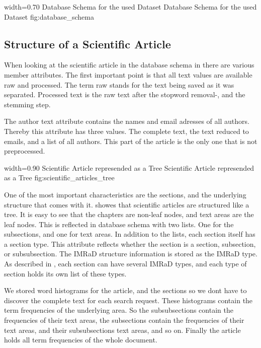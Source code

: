       {width=0.70\textwidth}
      {Database Schema for the used Dataset}
      {Database Schema for the used Dataset}
      {fig:database_schema}

\subsection{Structure of a Scientific Article}
\label{sec:structure_scientific_article}

When looking at the scientific article in the database schema in  there are various member attributes. The first important point is that all text values are available raw and processed. The term raw stands for the text being saved as it was separated. Processed text is the raw text after the stopword removal-, and the stemming step.

The author text attribute contains the names and email adresses of all authors. Thereby this attribute has three values. The complete text, the text reduced to emails, and a list of all authors. This part of the article is the only one that is not preprocessed.

      {width=0.90\textwidth}
      {Scientific Article represended as a Tree}
      {Scientific Article represended as a Tree}
      {fig:scientific_articles_tree}

One of the most important characteristics are the sections, and the underlying structure that comes with it.  showes that scientific articles are structured like a tree. It is easy to see that the chapters are non-leaf nodes, and text areas are the leaf nodes. This is reflected in database schema with two lists. One for the subsections, and one for text areas. In addition to the lists, each section itself has a section type. This attribute reflects whether the section is a section, subsection, or subsubsection. The IMRaD structure information is stored as the IMRaD type. As described in , each section can have several IMRaD types, and each type of section holds its own list of these types.

We stored word histograms for the article, and the sections so we dont have to discover the complete text for each search request. These histograms contain the term frequencies of the underlying area. So the subsubsections contain the frequencies of their text areas, the subsections contain the frequencies of their text areas, and their subsubsections text areas, and so on. Finally the article holds all term frequencies of the whole document.

